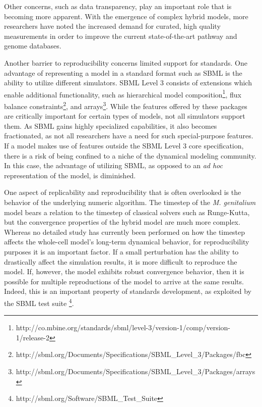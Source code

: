 \documentclass[journal,transmag,twoside]{IEEEtran}
\begin{document}
Other concerns, such as data transparency, play an important role that is becoming more apparent.
With the emergence of complex hybrid models, more researchers have noted the increased demand for curated, high quality measurements in order to improve the current state-of-the-art pathway and genome databases.

Another barrier to reproducibility concerns limited support for standards.
One advantage of representing a model in a standard format such as SBML is the ability
to utilize different simulators.
SBML Level 3 consists of extensions which enable additional
functionality, such as
hierarchical model composition\footnote{http://co.mbine.org/standards/sbml/level-3/version-1/comp/version-1/release-2},
flux balance constraints\footnote{ http://sbml.org/Documents/Specifications/SBML\_Level\_3/Packages/fbc}, and
arrays\footnote{http://sbml.org/Documents/Specifications/SBML\_Level\_3/Packages/arrays}.
While the features offered by these packages are critically important for certain
types of models, not all simulators support them.
As SBML gains highly specialized capabilities, it also becomes fractionated, as
not all researchers have a need for such special-purpose features.
If a model makes use of features outside the SBML Level 3 core specification,
there is a risk of being confined to a niche of the dynamical modeling community.
In this case, the advantage of utilizing SBML, as opposed to an \textit{ad hoc} representation
of the model, is diminished.

One aspect of replicability and reproducibility that is often overlooked is the
behavior of the underlying numeric algorithm.
The timestep of the \textit{M. genitalium} model bears a relation to the timestep
of classical solvers such as Runge-Kutta, but the convergence properties of the hybrid model
are much more complex.
Whereas no detailed study has currently been performed on how the timestep affects
the whole-cell model's long-term dynamical behavior, for reproducibility purposes it is
an important factor. If a small perturbation has the ability to drastically
affect the simulation results, it is more difficult to reproduce the model.
If, however, the model exhibits robust convergence behavior, then it is
possible for multiple reproductions of the model to arrive at the same results.
Indeed, this is an important property of standards development, as exploited by
the SBML test suite \footnote{http://sbml.org/Software/SBML\_Test\_Suite}.
\end{document}
